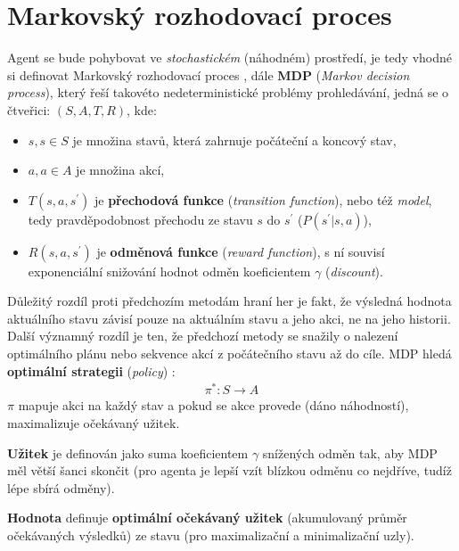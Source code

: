 \section{Markovský rozhodovací proces}
Agent se bude pohybovat ve \textit{stochastickém} (náhodném) prostředí, je tedy vhodné si definovat Markovský rozhodovací proces \cite{RLAprox}, dále \textbf{MDP} (\textit{Markov decision process}), který řeší takovéto nedeterministické problémy prohledávání, jedná se o čtveřici:
$(S,A,T,R)$, kde:
\begin{itemize}
\item $s, s \in S$ je množina stavů, která zahrnuje počáteční a koncový stav,
\item $a, a \in A$ je množina akcí,
\item $T(s,a,s^\prime)$ je \textbf{přechodová funkce} (\textit{transition function}), nebo též \textit{model}, tedy pravděpodobnost přechodu ze stavu $s$ do $s^\prime$ ($P(s^\prime| s, a) $),
\item $R(s,a,s^\prime)$ je  \textbf{odměnová funkce} (\textit{reward function}), s ní souvisí exponenciální snižování hodnot odměn koeficientem $\gamma$ (\textit{discount}).
\end{itemize}
Důležitý rozdíl proti předchozím metodám hraní her je fakt, že výsledná hodnota aktuálního stavu závisí pouze na aktuálním stavu a jeho akci, ne na jeho historii.
Další významný rozdíl je ten, že předchozí metody se snažily o nalezení optimálního plánu nebo sekvence akcí z počátečního stavu až do cíle. MDP hledá \textbf{optimální strategii} (\textit{policy}) \cite{agents}:
\begin{align}
\pi^*: S \to A
\end{align}
$\pi$ mapuje akci na každý stav a pokud se akce provede (dáno náhodností), maximalizuje očekávaný užitek.

\textbf{Užitek} \cite{agents} je definován jako suma koeficientem $\gamma$ snížených odměn tak, aby MDP měl větší šanci skončit (pro agenta je lepší vzít blízkou odměnu co nejdříve, tudíž lépe sbírá odměny).

\textbf{Hodnota} \cite{agents} definuje \textbf{optimální očekávaný užitek} (akumulovaný průměr očekávaných výsledků) ze stavu (pro maximalizační a minimalizační uzly).

